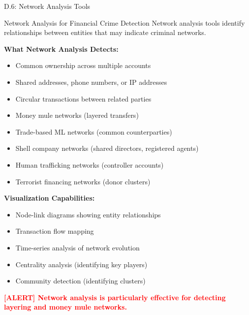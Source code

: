 \documentclass[11pt,a4paper]{beamer}
\newcommand{\redflag}[1]{\textcolor{red}{\textbf{[ALERT] #1}}}
\begin{document}
\begin{frame}{D.6: Network Analysis Tools}
	\begin{block}{Network Analysis for Financial Crime Detection}
		Network analysis tools identify relationships between entities that may indicate criminal networks.
	\end{block}
	\textbf{What Network Analysis Detects:}
	\begin{itemize}
		\item Common ownership across multiple accounts
		\item Shared addresses, phone numbers, or IP addresses
		\item Circular transactions between related parties
		\item Money mule networks (layered transfers)
		\item Trade-based ML networks (common counterparties)
		\item Shell company networks (shared directors, registered agents)
		\item Human trafficking networks (controller accounts)
		\item Terrorist financing networks (donor clusters)
	\end{itemize}
	\textbf{Visualization Capabilities:}
	\begin{itemize}
		\item Node-link diagrams showing entity relationships
		\item Transaction flow mapping
		\item Time-series analysis of network evolution
		\item Centrality analysis (identifying key players)
		\item Community detection (identifying clusters)
	\end{itemize}
	\redflag{Network analysis is particularly effective for detecting layering and money mule networks.}
\end{frame}
\end{document}
